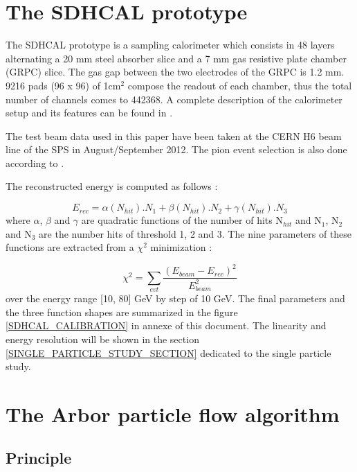 \documentclass[cits]{JINST}
\begin{document}
\section{The SDHCAL prototype}

The SDHCAL prototype is a sampling calorimeter which consists in 48 layers alternating a 20 mm steel absorber slice and a 7 mm gas resistive plate chamber (GRPC) slice. The gas gap between the two electrodes of the GRPC is 1.2 mm. 9216 pads (96 x 96) of 1cm$^2$ compose the readout of each chamber, thus the total number of channels  comes to 442368. A complete description of the calorimeter setup and its features can be found in \cite{sdhcal-paper}. 

The test beam data used in this paper have been taken at the CERN H6 beam line of the SPS in August/September 2012. The pion event selection is also done according to \cite{sdhcal-paper}.

The reconstructed energy is computed as follows :

\begin{equation}
  E_{rec} = \alpha(N_{hit}).N_{1}
          + \beta(N_{hit}) .N_{2}
          + \gamma(N_{hit}).N_{3}   
\end{equation}
where $\alpha$, $\beta$ and $\gamma$ are quadratic functions of the number of hits N$_{hit}$ and N$_1$, N$_2$ and N$_3$ are the number hits of threshold 1, 2 and 3. The nine parameters of these functions are extracted from a $\chi^2$ minimization :

\begin{equation}
  \chi^2 = \sum\limits_{evt} \frac{(E_{beam} - E_{rec})^2}{E_{beam}^2}
\end{equation}
over the energy range [10, 80] GeV by step of 10 GeV. The final parameters and the three function shapes are summarized in the figure \ref{SDHCAL_CALIBRATION} in annexe of this document. The linearity and energy resolution will be shown in the section \ref{SINGLE_PARTICLE_STUDY_SECTION} dedicated to the single particle study.

\section{The Arbor particle flow algorithm}

\subsection{Principle} 
\end{document}
